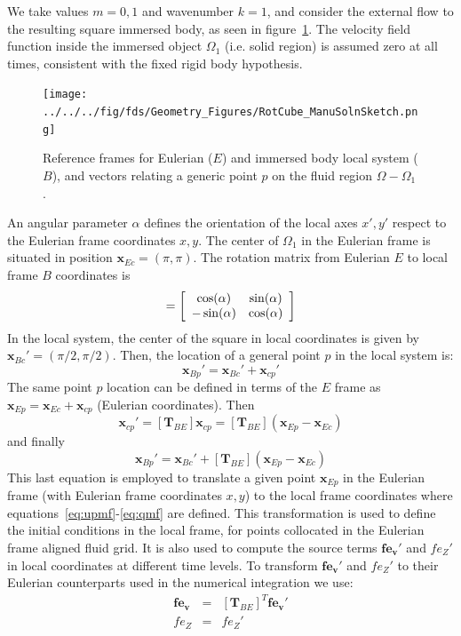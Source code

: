 \documentclass[11pt]{book}
\begin{document}
We take values $m=0,1$ and wavenumber $k=1$, and consider the external flow to the resulting square immersed body, as seen in figure~\ref{Fig:ManuSoln}. The velocity field function inside the immersed object $\Omega_1$ (i.e. solid region) is assumed zero at all times, consistent with the fixed rigid body hypothesis.
%
\begin{figure}[h]
      \centering
      \texttt{[image: ../../../fig/fds/Geometry\_Figures/RotCube\_ManuSolnSketch.png]}
      \caption{Reference frames for Eulerian ($E$) and immersed body local system ($B$), and vectors relating a generic point $p$ on the fluid region $\Omega-\Omega_1$.}
	\label{Fig:ManuSoln}
\end{figure}
%
An angular parameter $\alpha$ defines the orientation of the local axes $x',y'$ respect to the Eulerian frame coordinates $x,y$. The center of $\Omega_1$ in the Eulerian frame is situated in position $\mathbf{x}_{Ec}=(\pi,\pi)$. The rotation matrix from Eulerian $E$ to local frame $B$ coordinates is
%
\begin{equation}
  [\mathbf{T}_{BE}] = \left[ \begin{array}{c c}
                                          \cos(\alpha) & \sin(\alpha) \\
                                         -\sin(\alpha)  & \cos(\alpha) \end{array} \right]
\end{equation}
%
In the local system, the center of the square in local coordinates is given by $\mathbf{x}_{Bc}'=(\pi/2,\pi/2)$. Then, the location of a general point $p$ in the local system is:
%
\begin{equation}
    \mathbf{x}_{Bp}'= \mathbf{x}_{Bc}' +\mathbf{x}_{cp}'
\end{equation}
%
The same point $p$ location can be defined in terms of the $E$ frame as $\mathbf{x}_{Ep}= \mathbf{x}_{Ec} +\mathbf{x}_{cp}$ (Eulerian coordinates). Then
%
\begin{equation}
    \mathbf{x}_{cp}'=[\mathbf{T}_{BE}] \mathbf{x}_{cp}=[\mathbf{T}_{BE}] \left( \mathbf{x}_{Ep} - \mathbf{x}_{Ec} \right)
\end{equation}
%
and finally
%
\begin{equation}
    \mathbf{x}_{Bp}'= \mathbf{x}_{Bc}' +[\mathbf{T}_{BE}] \left( \mathbf{x}_{Ep} - \mathbf{x}_{Ec} \right)
\end{equation}
%
This last equation is employed to translate a given point $\mathbf{x}_{Ep}$ in the Eulerian frame (with Eulerian frame coordinates $x,y$) to the local frame coordinates where equations~\eqref{eq:upmf}-\eqref{eq:qmf} are defined. This transformation is used to define the initial conditions in the local frame, for points collocated in the Eulerian frame aligned fluid grid. It is also used to compute the source terms $\mathbf{fe_v'}$ and $fe_Z'$ in local coordinates at different time levels.
To transform  $\mathbf{fe_v'}$ and $fe_Z'$ to their Eulerian counterparts used in the numerical integration we use:
%
\begin{eqnarray}
  \mathbf{fe_v} &=& [\mathbf{T}_{BE}]^T \mathbf{fe_v'} \\
  fe_Z &=& fe_Z'
\end{eqnarray}
%
\end{document}
